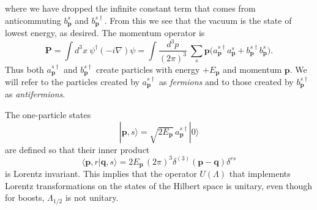 where we have dropped the infinite constant term that comes from
anticommuting $b_{\mathbf{p}}^s$ and $b_{\mathbf{p}}^{s\dagger}$.  From this we
see that the vacuum is the state of lowest energy, as desired.  The momentum
operator is
\begin{equation}
  \mathbf{P} = \int d^3x\ \psi^\dagger(-i\nabla)\psi
    = \int \frac{d^3p}{(2\pi)^3}\ \sum_s \mathbf{p}
      \bigl( a_{\mathbf{p}}^{s\dagger}a_{\mathbf{p}}^s
        + b_{\mathbf{p}}^{s\dagger}b_{\mathbf{p}}^s \bigr).
  \label{eq:3.107}
\end{equation}
Thus both $a_{\mathbf{p}}^{s\dagger}$ and $b_{\mathbf{p}}^{s\dagger}$ create
particles with energy $+E_{\mathbf{p}}$ and momentum $\mathbf{p}$.  We will
refer to the particles created by $a_{\mathbf{p}}^{s\dagger}$ as
\emph{fermions} and to those created by $b_{\mathbf{p}}^{s\dagger}$ as
\emph{antifermions}.

The one-particle states
\begin{equation}
  |\mathbf{p}, s\rangle = \sqrt{2E_{\mathbf{p}}}\,a_{\mathbf{p}}^{s\dagger}|0\rangle
  \label{eq:3.108}
\end{equation}
are defined so that their inner product
\begin{equation}
  \langle\mathbf{p}, r|\mathbf{q}, s\rangle
    = 2E_{\mathbf{p}}\,(2\pi)^3\delta^{(3)}(\mathbf{p}-\mathbf{q})\delta^{rs}
  \label{eq:3.109}
\end{equation}
is Lorentz invariant.  This implies that the operator $U(\Lambda)$ that
implements Lorentz transformations on the states of the Hilbert space is
unitary, even though for boosts, $\Lambda_{1/2}$ is not unitary.

